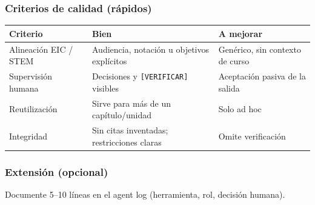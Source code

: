 \subsubsection*{Criterios de calidad (rápidos)}
\begin{tabularx}{\textwidth}{@{}lXX@{}}
\toprule
Criterio & Bien & A mejorar \\
\midrule
Alineación EIC / STEM & Audiencia, notación u objetivos explícitos & Genérico, sin contexto de curso \\
Supervisión humana & Decisiones y \texttt{[VERIFICAR]} visibles & Aceptación pasiva de la salida \\
Reutilización & Sirve para más de un capítulo/unidad & Solo ad hoc \\
Integridad & Sin citas inventadas; restricciones claras & Omite verificación \\
\bottomrule
\end{tabularx}

\subsubsection*{Extensión (opcional)}
Documente 5--10 líneas en el agent log (herramienta, rol, decisión humana).
